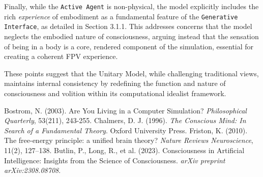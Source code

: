 \documentclass[12pt, a4paper]{article}
\begin{document}
Finally, while the \texttt{Active Agent} is non-physical, the model explicitly includes the rich \textit{experience} of embodiment as a fundamental feature of the \texttt{Generative Interface}, as detailed in Section 3.1.1. This addresses concerns that the model neglects the embodied nature of consciousness, arguing instead that the sensation of being in a body is a core, rendered component of the simulation, essential for creating a coherent FPV experience.

These points suggest that the Unitary Model, while challenging traditional views, maintains internal consistency by redefining the function and nature of consciousness and volition within its computational idealist framework.

\begin{thebibliography}{9}
     Bostrom, N. (2003). Are You Living in a Computer Simulation? \textit{Philosophical Quarterly}, 53(211), 243-255.
     Chalmers, D. J. (1996). \textit{The Conscious Mind: In Search of a Fundamental Theory}. Oxford University Press.
     Friston, K. (2010). The free-energy principle: a unified brain theory? \textit{Nature Reviews Neuroscience}, 11(2), 127–138.
     Butlin, P., Long, R., et al. (2023). Consciousness in Artificial Intelligence: Insights from the Science of Consciousness. \textit{arXiv preprint arXiv:2308.08708}.
\end{thebibliography}
\end{document}
